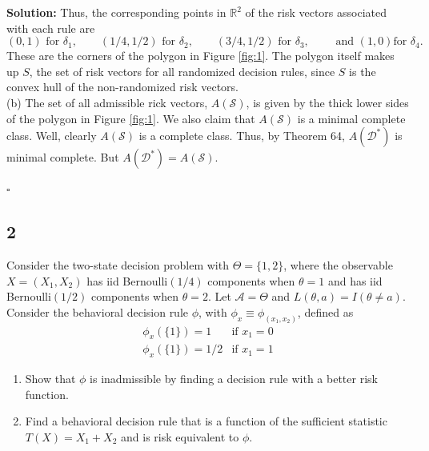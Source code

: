 \documentclass[12pt]{article}
\newcounter{ProofCounter}
\newenvironment{Solution}{\stepcounter{ProofCounter}\textbf{Solution:}}{\hfill$\square$}
\begin{document}
\begin{Solution}
  Thus, the corresponding points in $\mathbb{R}^2$ of the risk vectors associated with each rule are 
  \[
    (0,1) \text{ for } \delta_1, \qquad (1/4, 1/2) \text{ for } \delta_2, \qquad (3/4, 1/2) \text{ for } \delta_3, \qquad \text{ and } (1, 0) \text{
    for } \delta_4.
  \]
  These are the corners of the polygon in Figure \ref{fig:1}. The polygon itself makes up $S$, the set of risk vectors for all randomized decision
  rules, since $S$ is the convex hull of the non-randomized risk vectors. \\

  (b) The set of all admissible rick vectors, $A(\mathcal{S})$, is given by the thick lower sides of the polygon in Figure \ref{fig:1}. We also claim that
  $A(\mathcal{S})$ is a minimal complete class. Well, clearly $A(\mathcal{S})$ is a complete class. Thus, by Theorem 64, $A(\mathcal{D}^{*})$ is
  minimal complete. But $A(\mathcal{D}^*) = A(\mathcal{S})$.

\end{Solution}

\subsection*{2}
\begin{tcolorbox}
Consider the two-state decision problem with $\Theta=\{1,2\}$, where the observable $X=(X_1,X_2)$ has iid Bernoulli$(1/4)$
  components when $\theta=1$ and  has iid Bernoulli$(1/2)$
  components when $\theta=2$. Let $\mathcal{A}=\Theta$ and $L(\theta,a)=I(\theta \neq a)$.  Consider the behavioral decision rule $\phi$, with $\phi_x\equiv \phi_{(x_1,x_2)}$, defined as
  \begin{eqnarray*}
    \phi_x(\{1\})=1 &\mbox{if $x_1=0$}\\
    \phi_x(\{1\})=1/2 &\mbox{if $x_1=1$}
  \end{eqnarray*}

  \begin{enumerate}
    \item Show that $\phi$ is inadmissible by finding a decision rule with a better risk function.

    \item Find a behavioral decision rule that is a function of the sufficient statistic $T(X)=X_1+X_2$ and is risk equivalent to $\phi$.

  \end{enumerate}
\end{tcolorbox}
\end{document}
